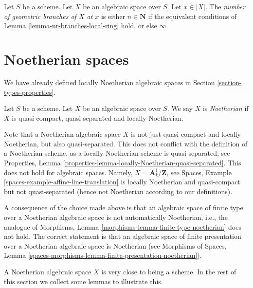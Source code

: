 \begin{definition}
\label{definition-number-of-geometric-branches}
Let $S$ be a scheme.
Let $X$ be an algebraic space over $S$.
Let $x \in |X|$. The {\it number of geometric branches of $X$ at $x$} is
either $n \in \mathbf{N}$ if the equivalent conditions
of Lemma \ref{lemma-nr-branches-local-ring}
hold, or else $\infty$.
\end{definition}








\section{Noetherian spaces}
\label{section-noetherian}

\noindent
We have already defined locally Noetherian algebraic spaces in
Section \ref{section-types-properties}.

\begin{definition}
\label{definition-noetherian}
Let $S$ be a scheme. Let $X$ be an algebraic space over $S$.
We say $X$ is {\it Noetherian} if $X$ is quasi-compact, quasi-separated
and locally Noetherian.
\end{definition}

\noindent
Note that a Noetherian algebraic space $X$ is not just quasi-compact
and locally Noetherian, but also quasi-separated. This does not conflict
with the definition of a Noetherian scheme, as a locally Noetherian
scheme is quasi-separated, see
Properties, Lemma \ref{properties-lemma-locally-Noetherian-quasi-separated}.
This does not hold for algebraic spaces. Namely,
$X = \mathbf{A}^1_k/\mathbf{Z}$, see
Spaces, Example \ref{spaces-example-affine-line-translation}
is locally Noetherian and quasi-compact but not quasi-separated
(hence not Noetherian according to our definitions).

\medskip\noindent
A consequence of the choice made above is that an algebraic space
of finite type over a Noetherian algebraic space is not automatically
Noetherian, i.e., the analogue of
Morphisms, Lemma \ref{morphisms-lemma-finite-type-noetherian}
does not hold. The correct statement is that an algebraic space of
finite presentation over a Noetherian algebraic space is Noetherian
(see
Morphisms of Spaces,
Lemma \ref{spaces-morphisms-lemma-finite-presentation-noetherian}).

\medskip\noindent
A Noetherian algebraic space $X$ is very close to being a scheme.
In the rest of this section we collect some lemmas to illustrate this.

